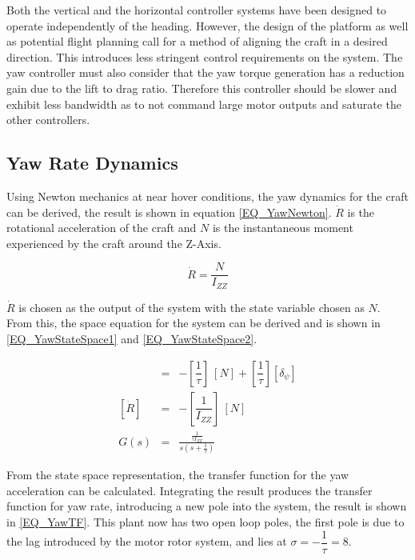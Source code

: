 		Both the vertical and the horizontal controller systems have been designed to operate independently of the heading. However, the design of the platform as well as potential flight planning call for a method of aligning the craft in a desired direction. This introduces less stringent control requirements on the system. The yaw controller must also consider that the yaw torque generation has a reduction gain due to the lift to drag ratio. Therefore this controller should be slower and exhibit less bandwidth as to not command large motor outputs and saturate the other controllers.
		
		\subsection{Yaw Rate Dynamics}
		Using Newton mechanics at near hover conditions, the yaw dynamics for the craft can be derived, the result is shown in equation \eqref{EQ_YawNewton}. $\dot{R}$ is the rotational acceleration of the craft and $N$ is the instantaneous moment experienced by the craft around the Z-Axis.
		
		\begin{equation}
		\label{EQ_YawNewton}
		\dot{R} = \dfrac{N}{I_{ZZ}}
		\end{equation}
		
		$\dot{R}$ is  chosen as the output of the system with the state variable chosen as $N$. From this, the space equation for the system can be derived and is shown in \eqref{EQ_YawStateSpace1} and \eqref{EQ_YawStateSpace2}. 
		
		\begin{eqnarray}
		[\dot{N}] &=& - [\dfrac{1}{\tau}] \ [N] + [\dfrac{1}{\tau}] [\delta_\psi]\label{EQ_YawStateSpace1}\\\label{EQ_HeaveStateSpace22}
		[\dot{R}] &=& - [\dfrac{1}{I_{ZZ}}] \ [N]\label{EQ_YawStateSpace2}\\
		G(s) &=& \frac{\frac{1}{\tau I_{ZZ}}}{s (s + \frac{1}{\tau})}\label{EQ_YawTF}
		\end{eqnarray}
		
		From the state space representation, the transfer function for the yaw acceleration can be calculated. Integrating the result produces the transfer function for yaw rate, introducing a new pole into the system, the result is shown in \eqref{EQ_YawTF}. This plant now has two open loop poles, the first pole is due to the lag introduced by the motor rotor system, and lies at $\sigma = -\dfrac{1}{\tau} = 8$. 
		
